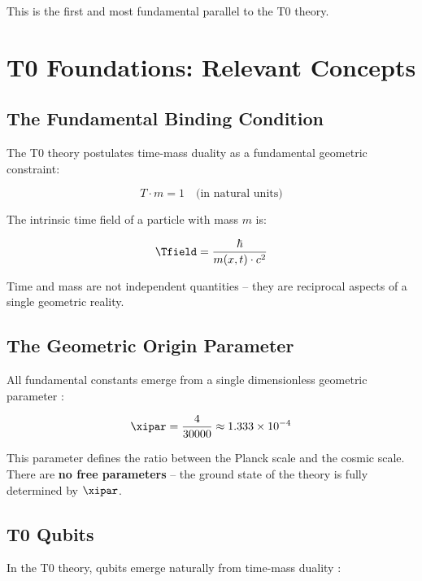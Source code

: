 This is the first and most fundamental parallel to the T0 theory.

\clearpage

\section{T0 Foundations: Relevant Concepts}
\label{sec:t0}

\subsection{The Fundamental Binding Condition}

The T0 theory postulates time-mass duality as a fundamental geometric constraint:

\begin{equation}
    T \cdot m = 1 \quad \text{(in natural units)}
    \label{eq:t0_constraint}
\end{equation}

The intrinsic time field of a particle with mass $m$ is:

\begin{equation}
    \Tfield = \frac{\hbar}{m(x,t) \cdot c^2}
    \label{eq:t0_timefield}
\end{equation}

Time and mass are not independent quantities -- they are reciprocal aspects of a
single geometric reality.

\subsection{The Geometric Origin Parameter}

All fundamental constants emerge from a single dimensionless geometric parameter
\cite{pascher_xi_2025}:

\begin{equation}
    \xipar = \frac{4}{30000} \approx 1.333 \times 10^{-4}
    \label{eq:xi_param}
\end{equation}

This parameter defines the ratio between the Planck scale and the cosmic scale.
There are \textbf{no free parameters} -- the ground state of the theory is fully
determined by $\xipar$.

\subsection{T0 Qubits}

In the T0 theory, qubits emerge naturally from time-mass duality
\cite{pascher_quantum_2025}:

